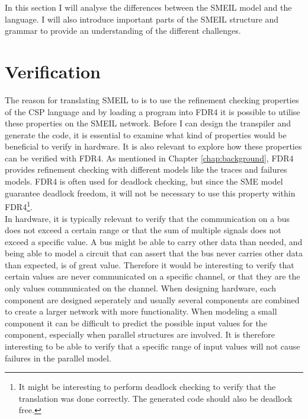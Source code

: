 


In this section I will analyse the differences between the SMEIL model and the \cspm{} language. I will also introduce important parts of the SMEIL structure and grammar to provide an understanding of the different challenges.
\section{Verification}
\label{sec:analysis_verification}
The reason for translating SMEIL to \cspm{} is to use the refinement checking properties of the CSP language and by loading a \cspm{} program into FDR4 it is possible to utilise these properties on the SMEIL network. Before I can design the transpiler and generate the \cspm{} code, it is essential to examine what kind of properties would be beneficial to verify in hardware. It is also relevant to explore how these properties can be verified with FDR4. As mentioned in Chapter \ref{chap:background}, FDR4 provides refinement checking with different models like the traces and failures models. FDR4 is often used for deadlock checking, but since the SME model guarantee deadlock freedom, it will not be necessary to use this property within FDR4\footnote{It might be interesting to perform deadlock checking to verify that the translation was done correctly. The generated \cspm{} code should also be deadlock free.}.\\

In hardware, it is typically relevant to verify that the communication on a bus does not exceed a certain range or that the sum of multiple signals does not exceed a specific value. A bus might be able to carry other data than needed, and being able to model a circuit that can assert that the bus never carries other data than expected, is of great value. Therefore it would be interesting to verify that certain values are never communicated on a specific channel, or that they are the only values communicated on the channel. When designing hardware, each component are designed seperately and usually several components are combined to create a larger network with more functionality. When modeling a small component it can be difficult to predict the possible input values for the component, especially when parallel structures are involved. It is therefore interesting to be able to verify that a specific range of input values will not cause failures in the parallel model.\\

